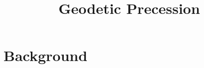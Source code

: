 \documentclass[12pt, letterpaper, preprint]{aastex}
\begin{document}
\title{Geodetic Precession}
\maketitle

\section{Background}



\end{document}

